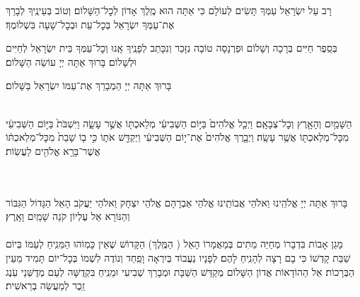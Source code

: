 



\retzeh

\yaalehveyavo

\zion

\maarivmodim


רָב עַל יִשְׂרָאֵל עַמְּךָ תָּשִׂים לְעוֹלָם כִּי אַתָּה הוּא מֶֽלֶךְ אָדוֹן לְכׇל־הַשָּׁלוֹם׃ וְטוֹב בְּעֵינֶֽיךָ לְבָרֵךְ אֶת־עַמְּךָ יִשְׂרָאֵל בְּכׇל־עֵת וּבְכׇל־שָׁעָה בִּשְׁלוֹמֶךָ׃
\vspace{-0.4\baselineskip}
\begin{paracol}{2}

\begin{small}
בְּסֵֽפֶר חַיִּים בְּרָכָה וְשָׁלוֹם וּפַרְנָסָה טוֹבָה נִזָּכֵר וְנִכָּתֵב לְפָנֶֽיךָ אָֽנוּ וְכׇל־עַמְּךָ בֵּית יִשְׂרָאֵל לְחַיִּים וּלְשָׁלוֹם׃ בָּרוּךְ אַתָּה יְיָ עוֹשֵׂה הַשָּׁלוֹם׃
\end{small}


\switchcolumn

בָּרוּךְ אַתָּה יְיָ הַמְבָרֵךְ אֶת־עַמּוֹ יִשְׂרָאֵל בַּשָּׁלוֹם׃

\end{paracol}

\tachanunim

\label{vayachulu}
\\
 
הַשָּׁמַ֥יִם וְהָאָ֖רֶץ וְכׇל־צְבָאָֽם׃ וַיְכַ֤ל אֱלֹהִים֙ בַּיּ֣וֹם הַשְּׁבִיעִ֔י מְלַאכְתּ֖וֹ אֲשֶׁ֣ר עָשָׂ֑ה וַיִּשְׁבֹּת֙ בַּיּ֣וֹם הַשְּׁבִיעִ֔י מִכׇּל־מְלַאכְתּ֖וֹ אֲשֶׁ֥ר עָשָֽׂה׃ וַיְבָ֤רֶךְ אֱלֹהִים֙ אֶת־י֣וֹם הַשְּׁבִיעִ֔י וַיְקַדֵּ֖שׁ אֹת֑וֹ כִּ֣י ב֤וֹ שָׁבַת֙ מִכׇּל־מְלַאכְתּ֔וֹ אֲשֶׁר־בָּרָ֥א אֱלֹהִ֖ים לַעֲשֽׂוֹת׃


\\
\\
בָּרוּךְ אַתָּה יְיָ אֱלֹהֵֽינוּ וֵאלֹהֵי אֲבוֹתֵֽינוּ אֱלֹהֵי אַבְרָהָם אֱלֹהֵי יִצְחָק וֵאלֹהֵי יַעֲקֹב הָאֵל הַגָּדוֹל הַגִּבּוֹר וְהַנּוֹרָא אֵל עֶלְיוֹן קֹנֵה שָׁמַֽיִם וָאָֽרֶץ׃\\
\\
מָגֵן אָבוֹת בִּדְבָרוֹ מְחַיֵּה מֵתִים בְּמַאֲמָרוֹ הָאֵל
( הַמֶּֽלֶךְ)
הַקָּדוֹשׁ שֶׁאֵין כָּמֽוֹהוּ הַמֵּנִֽיחַ לְעַמּוֹ בְּיוֹם שַׁבַּת קָדְשׁוֹ כִּי בָם רָצָה לְהָנִֽיחַ לָהֶם׃ לְפָנָיו נַעֲבוֹד בְּיִרְאָה וָפַֽחַד וְנוֹדֶה לִשְׁמוֹ בְּכׇל־יוֹם תָּמִיד מֵעֵין הַבְּרָכוֹת׃ אֵל הַהוֹדָאוֹת אֲדוֹן הַשָּׁלוֹם מְקַדֵּשׁ הַשַּׁבָּת וּמְבָרֵךְ שְׁבִיעִי וּמֵנִֽיחַ בִּקְדֻשָּׁה לְעַם מְדֻשְּׁנֵי עֹֽנֶג זֵֽכֶר לְמַעֲשֵׂה בְרֵאשִׁית׃

